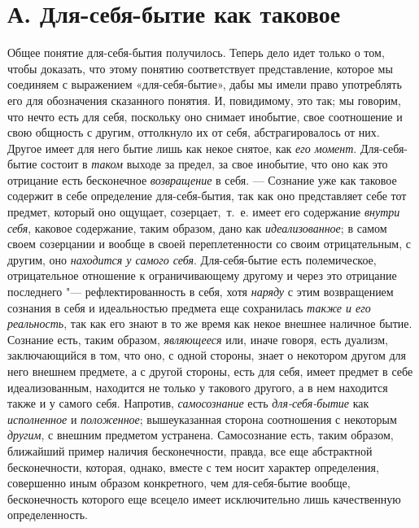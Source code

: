 \section*{А. Для-себя-бытие как таковое}
Общее понятие для-себя-бытия получилось. Теперь дело идет только о том,
чтобы доказать, что этому понятию соответствует представление, которое мы
соединяем с выражением «для-себя-бытие», дабы мы имели право употреблять
его для обозначения сказанного понятия. И, повидимому, это так; мы говорим,
что нечто есть для себя, поскольку оно снимает инобытие, свое соотношение и
свою общность с другим, оттолкнуло их от себя, абстрагировалось от них.
Другое имеет для него бытие лишь как некое снятое, как
{\em его момент}. Для-себя-бытие состоит в
{\em таком} выходе за предел, за свое инобытие, что оно
как это отрицание есть бесконечное {\em возвращение} в
себя. — Сознание уже как таковое содержит в себе определение
для-себя-бытия, так как оно представляет себе тот предмет, который оно
ощущает, созерцает,~т.~е. имеет его содержание
{\em внутри себя}, каковое содержание, таким образом,
дано как {\em идеализованное}; в самом своем созерцании
и вообще в своей переплетенности со своим отрицательным, с другим, оно
{\em находится у самого себя}. Для-себя-бытие есть
полемическое, отрицательное отношение к ограничивающему другому и через это
отрицание последнего "--- рефлектированность в себя, хотя
{\em наряду} с этим возвращением сознания в себя и
идеальностью предмета еще сохранилась {\em также и его
реальность}, так как его знают в то же время как
некое внешнее наличное бытие. Сознание есть, таким образом,
{\em являющееся} или, иначе говоря, есть дуализм,
заключающийся в том, что оно, с одной стороны, знает о некотором другом для
него внешнем предмете, а с другой стороны, есть для себя, имеет предмет в
себе идеализованным, находится не только у такового другого, а в нем
находится также и у самого себя. Напротив,
{\em самосознание} есть
{\em для-себя-бытие} как
{\em исполненное} и
{\em положенное}; вышеуказанная сторона соотношения с
некоторым {\em другим}, с внешним предметом устранена.
Самосознание есть, таким образом, ближайший пример наличия бесконечности,
правда, все еще абстрактной бесконечности, которая, однако, вместе с тем
носит характер определения, совершенно иным образом конкретного, чем
для-себя-бытие вообще, бесконечность которого еще всецело имеет
исключительно лишь качественную определенность.

